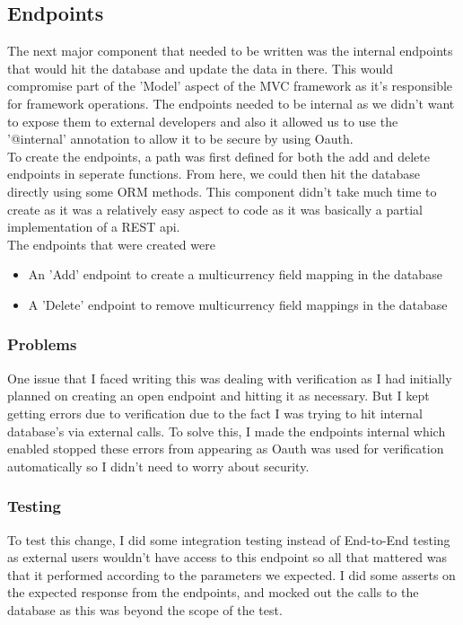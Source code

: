 \subsection{Endpoints}
The next major component that needed to be written was the internal endpoints that would hit the database and update the data in there. This would compromise part of the 'Model' aspect of the MVC framework as it's responsible for framework operations. The endpoints needed to be internal as we didn't want to expose them to external developers and also it allowed us to use the '@internal' annotation to allow it to be secure by using Oauth. \newline \\ To create the endpoints, a path was first defined for both the add and delete endpoints in seperate functions. From here, we could then hit the database directly using some ORM methods. This component didn't take much time to create as it was a relatively easy aspect to code as it was basically a partial implementation of a REST api. \newline \\ The endpoints that were created were  \begin{itemize}
\item An 'Add' endpoint to create a multicurrency field mapping in the database
\item A 'Delete' endpoint to remove multicurrency field mappings in the database
\end{itemize}

\subsubsection{Problems}
One issue that I faced writing this was dealing with verification as I had initially planned on creating an open endpoint and hitting it as necessary. But I kept getting errors due to verification due to the fact I was trying to hit internal database's via external calls. To solve this, I made the endpoints internal which enabled stopped these errors from appearing as Oauth was used for verification automatically so I didn't need to worry about security.

\subsubsection{Testing}
To test this change, I did some integration testing instead of End-to-End testing as external users wouldn't have access to this endpoint so all that mattered was that it performed according to the parameters we expected. I did some asserts on the expected response from the endpoints, and mocked out the calls to the database as this was beyond the scope of the test. 


